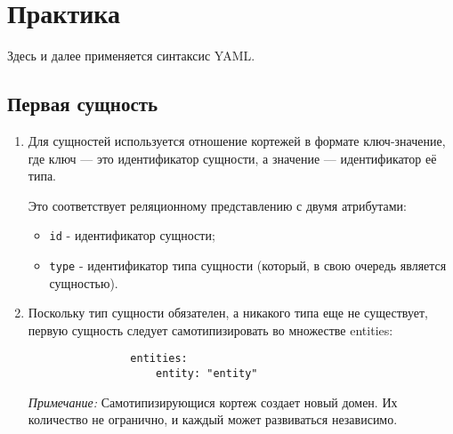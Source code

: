 \documentclass[final]{article}
\begin{document}
    \section{Практика}

        Здесь и далее применяется синтаксис YAML.

        \subsection{Первая сущность}

            \begin{enumerate}

                \item Для сущностей используется отношение кортежей в формате 
                ключ-значение, где ключ — это идентификатор сущности, а значение — 
                идентификатор её типа. 

                Это соответствует реляционному представлению с двумя атрибутами:

                \begin{itemize}
                    \item \texttt{id} - идентификатор сущности;
                    \item \texttt{type} - идентификатор типа сущности (который, в свою 
                    очередь является сущностью).
                \end{itemize}
                
                \item Поскольку тип сущности обязателен, а никакого типа еще не 
                существует, первую сущность следует самотипизировать во 
                множестве entities:

                \begin{verbatim}
                entities:
                    entity: "entity"
                \end{verbatim}


                \textit{Примечание:} Самотипизирующися кортеж создает новый домен. 
                Их количество не огранично, и каждый может развиваться независимо.

            \end{enumerate}
\end{document}
